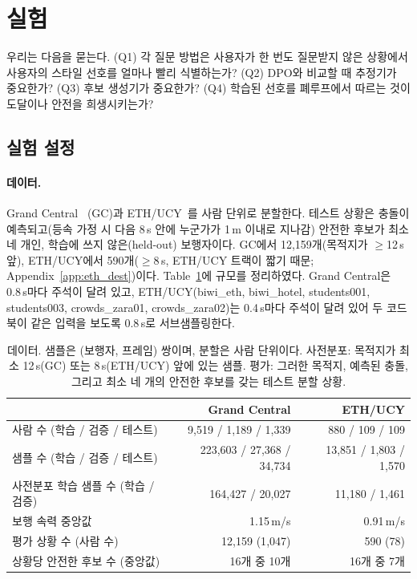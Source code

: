 \section{실험}
\label{sec:experiments}

우리는 다음을 묻는다. (Q1) 각 질문 방법은 사용자가 한 번도 질문받지 않은 상황에서 사용자의 스타일 선호를 얼마나 빨리 식별하는가?
(Q2) DPO와 비교할 때 추정기가 중요한가? (Q3) 후보 생성기가 중요한가? (Q4) 학습된 선호를 폐루프에서 따르는 것이
도달이나 안전을 희생시키는가?

\subsection{실험 설정}
\paragraph{데이터.} Grand Central~\citep{zhou2012understanding} (GC)과 ETH/UCY~\citep{pellegrini2009you,lerner2007crowds}를 사람 단위로 분할한다.
테스트 상황은 충돌이 예측되고(등속 가정 시 다음 8\,s 안에 누군가가 1\,m 이내로 지나감)
안전한 후보가 최소 네 개인, 학습에 쓰지 않은(held-out) 보행자이다. GC에서 12{,}159개(목적지가 $\ge$12\,s 앞), ETH/UCY에서 590개($\ge$8\,s, ETH/UCY 트랙이
짧기 때문; Appendix~\ref{app:eth_dest})이다.
Table~\ref{tab:data}에 규모를 정리하였다. Grand Central은 0.8\,s마다 주석이 달려 있고, ETH/UCY(biwi\_eth, biwi\_hotel, students001,
students003, crowds\_zara01, crowds\_zara02)는 0.4\,s마다 주석이 달려 있어 두 코드북이 같은 입력을 보도록 0.8\,s로 서브샘플링한다.

\begin{table}[t]
\centering
\caption{데이터. 샘플은 (보행자, 프레임) 쌍이며, 분할은 사람 단위이다. 사전분포: 목적지가 최소 12\,s(GC) 또는
8\,s(ETH/UCY) 앞에 있는 샘플. 평가: 그러한 목적지, 예측된 충돌, 그리고 최소 네 개의 안전한 후보를 갖는 테스트 분할 상황.}
\label{tab:data}
\setlength{\tabcolsep}{4pt}
\begin{tabular}{lrr}
\toprule
 & Grand Central & ETH/UCY \\
\midrule
사람 수 (학습 / 검증 / 테스트)        & 9{,}519 / 1{,}189 / 1{,}339 & 880 / 109 / 109 \\
샘플 수 (학습 / 검증 / 테스트)       & 223{,}603 / 27{,}368 / 34{,}734 & 13{,}851 / 1{,}803 / 1{,}570 \\
사전분포 학습 샘플 수 (학습 / 검증) & 164{,}427 / 20{,}027 & 11{,}180 / 1{,}461 \\
보행 속력 중앙값               & 1.15\,m/s & 0.91\,m/s \\
평가 상황 수 (사람 수)     & 12{,}159 (1{,}047) & 590 (78) \\
상황당 안전한 후보 수 (중앙값) & 16개 중 10개 & 16개 중 7개 \\
\bottomrule
\end{tabular}
\end{table}

